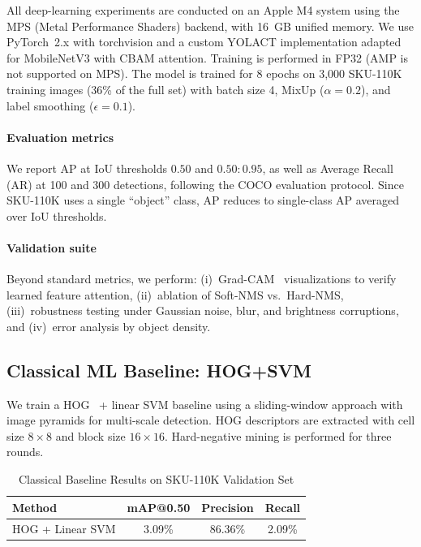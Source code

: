 \documentclass[conference]{IEEEtran}
\begin{document}
All deep-learning experiments are conducted on an Apple M4 system using
the MPS (Metal Performance Shaders) backend, with 16~GB unified memory.
We use PyTorch~2.x with torchvision and a custom YOLACT implementation
adapted for MobileNetV3 with CBAM attention. Training is performed in
FP32 (AMP is not supported on MPS). The model is trained for 8 epochs
on 3{,}000 SKU-110K training images (36\% of the full set) with batch
size 4, MixUp ($\alpha = 0.2$), and label smoothing ($\epsilon = 0.1$).

\paragraph{Evaluation metrics}
We report AP at IoU thresholds $0.50$ and $0.50{:}0.95$, as well as
Average Recall (AR) at 100 and 300 detections, following the COCO
evaluation protocol. Since SKU-110K uses a single ``object'' class, AP
reduces to single-class AP averaged over IoU thresholds.

\paragraph{Validation suite}
Beyond standard metrics, we perform: (i)~Grad-CAM~\cite{selvaraju2017gradcam}
visualizations to verify learned feature attention, (ii)~ablation of
Soft-NMS vs.\ Hard-NMS, (iii)~robustness testing under Gaussian noise,
blur, and brightness corruptions, and (iv)~error analysis by object
density.

\subsection{Classical ML Baseline: HOG+SVM}
\label{sec:hog}

We train a HOG~\cite{dalal2005hog} + linear SVM baseline using a
sliding-window approach with image pyramids for multi-scale detection.
HOG descriptors are extracted with cell size $8\times 8$ and block size
$16\times 16$. Hard-negative mining is performed for three rounds.

\begin{table}[t]
  \centering
  \caption{Classical Baseline Results on SKU-110K Validation Set}
  \label{tab:hog}
  \begin{tabular}{@{}lccc@{}}
    \toprule
    Method & mAP@0.50 & Precision & Recall \\
    \midrule
    HOG + Linear SVM & 3.09\% & 86.36\% & 2.09\% \\
    \bottomrule
  \end{tabular}
\end{table}
\end{document}

